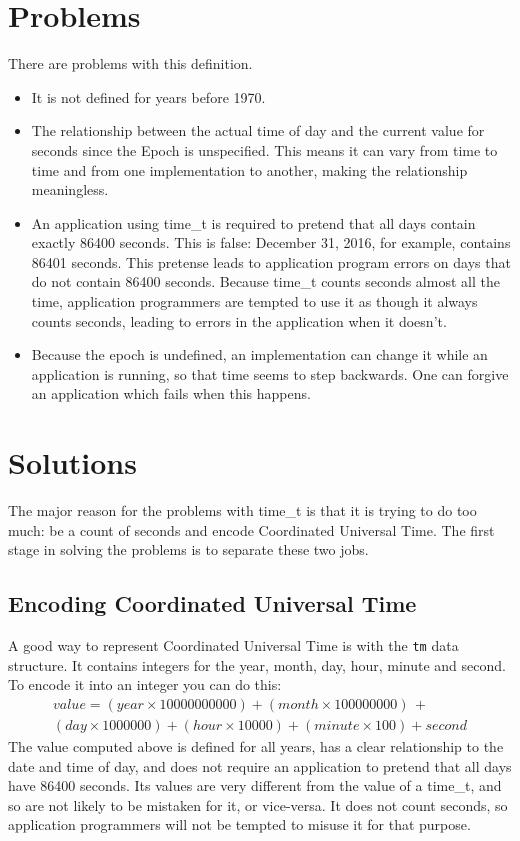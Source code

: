 \documentclass[letterpaper,twoside]{article}
\begin{document}
\section{Problems}
There are problems with this definition.
\begin{itemize}
\item{It is not defined for years before 1970.}
\item{The relationship between the actual time of day and the current value
  for seconds since the Epoch is unspecified.
  This means it can vary from time to time
  and from one implementation to another, making the
  relationship meaningless.}
\item{An application using {\ttfamily time\_t} is required to pretend that
  all days
  contain exactly \num{86400} seconds.  This is false: December 31, 2016, for
  example, contains \num{86401} seconds.  This pretense leads to application
  program errors on days that do not contain \num{86400} seconds.
  Because {\ttfamily time\_t} counts seconds almost all the time,
  application programmers
  are tempted to use it as though it always counts seconds,
  leading to errors in the application when it doesn't.}
\item{Because the epoch is undefined, an implementation can change
  it while an application is running, so that time seems to step
  backwards.  One can forgive an application which fails when this
  happens.}
\end{itemize}

\section{Solutions}
The major reason for the problems with {\ttfamily time\_t} is that it is
trying to do
too much: be a count of seconds and encode Coordinated Universal Time.
The first stage in solving the problems is to separate these two jobs.
\subsection{Encoding Coordinated Universal Time}
A good way to represent Coordinated Universal Time is with the \verb|tm| data
structure.  It contains integers for the year, month, day, hour, minute
and second.  To encode it into an integer you can do this:
\begin{multline*}
  value = (year \times 10000000000) + (month \times 100000000) \,+ \\
  (day \times 1000000) + (hour \times 10000) + (minute \times 100) + second
\end{multline*}
The value computed above is defined for all years, has a clear relationship
to the date and time of day, and does not require an application to pretend
that all days have \num{86400} seconds.  Its values are very different from
the value of a {\ttfamily time\_t}, and so are not likely to be mistaken for it,
or vice-versa.  It does not count seconds, so application programmers
will not be tempted to misuse it for that purpose.
\end{document}
